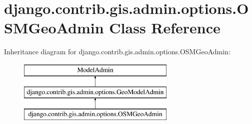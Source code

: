 \hypertarget{classdjango_1_1contrib_1_1gis_1_1admin_1_1options_1_1_o_s_m_geo_admin}{}\section{django.\+contrib.\+gis.\+admin.\+options.\+O\+S\+M\+Geo\+Admin Class Reference}
\label{classdjango_1_1contrib_1_1gis_1_1admin_1_1options_1_1_o_s_m_geo_admin}
Inheritance diagram for django.\+contrib.\+gis.\+admin.\+options.\+O\+S\+M\+Geo\+Admin\+:\begin{figure}[H]
\begin{center}
\leavevmode
\includegraphics[height=3.000000cm]{classdjango_1_1contrib_1_1gis_1_1admin_1_1options_1_1_o_s_m_geo_admin}
\end{center}
\end{figure}
